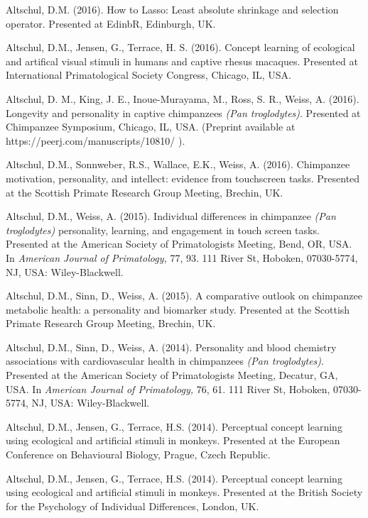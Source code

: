 \documentclass[margin,line]{res}
\begin{document}
\begin{resume}
Altschul, D.M. (2016). How to Lasso: Least absolute shrinkage and selection operator. Presented at EdinbR, Edinburgh, UK.

Altschul, D.M., Jensen, G.,  Terrace, H. S. (2016). Concept learning of ecological and artifical visual stimuli in humans and captive rhesus macaques. Presented at International Primatological Society Congress, Chicago, IL, USA.

Altschul, D. M., King, J. E., Inoue-Murayama, M., Ross, S. R., Weiss, A. (2016). Longevity and personality in captive chimpanzees {\it (Pan troglodytes)}. Presented at Chimpanzee Symposium, Chicago, IL, USA. (Preprint available at https://peerj.com/manuscripts/10810/ ).

Altschul, D.M., Sonnweber, R.S., Wallace, E.K., Weiss, A. (2016). Chimpanzee motivation, personality, and intellect: evidence from touchscreen tasks. Presented at the Scottish Primate Research Group Meeting, Brechin, UK.

Altschul, D.M., Weiss, A. (2015). Individual differences in chimpanzee {\it (Pan troglodytes)} personality, learning, and engagement in touch screen tasks. Presented at the American Society of Primatologists Meeting, Bend, OR, USA. In {\it American Journal of Primatology,} 77, 93. 111 River St, Hoboken, 07030-5774, NJ, USA: Wiley-Blackwell.

Altschul, D.M., Sinn, D., Weiss, A. (2015). A comparative outlook on chimpanzee metabolic health: a personality and biomarker study. Presented at the Scottish Primate Research Group Meeting, Brechin, UK.

Altschul, D.M., Sinn, D., Weiss, A. (2014).  Personality and blood chemistry associations with cardiovascular health in chimpanzees {\it (Pan troglodytes)}. Presented at the American Society of Primatologists Meeting, Decatur, GA, USA. In {\it American Journal of Primatology,} 76, 61. 111 River St, Hoboken, 07030-5774, NJ, USA: Wiley-Blackwell.

Altschul, D.M., Jensen, G., Terrace, H.S. (2014). Perceptual concept learning using ecological and artificial stimuli in monkeys. Presented at the European Conference on Behavioural Biology, Prague, Czech Republic.

Altschul, D.M., Jensen, G., Terrace, H.S. (2014). Perceptual concept learning using ecological and artificial stimuli in monkeys. Presented at the British Society for the Psychology of Individual Differences, London, UK.


\end{resume}
\end{document}
